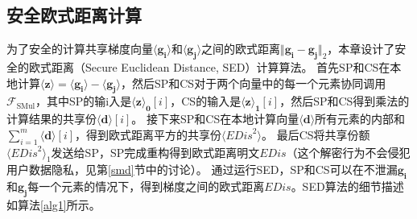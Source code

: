 \begin{table}
	\centering
	\caption{符号说明}
	\label{table-sym}
\end{table}

\subsection{安全欧式距离计算}
为了安全的计算共享梯度向量$\boldsymbol{\langle g_i\rangle}$和$\boldsymbol{\langle g_j\rangle}$之间的欧式距离$\Vert \boldsymbol{g_i} - \boldsymbol{g_j} \Vert_2$，本章设计了安全的欧式距离（Secure Euclidean Distance, SED）计算算法。
首先SP和CS在本地计算$\boldsymbol{\langle z\rangle} = \boldsymbol{\langle g_i\rangle} - \boldsymbol{\langle g_j\rangle}$，然后SP和CS对于两个向量中的每一个元素协同调用$\mathcal{F}_{\text {SMul}}$，其中SP的输i入是$\boldsymbol{\langle z\rangle_0}[i]$，CS的输入是$\boldsymbol{\langle z\rangle_1}[i]$，然后SP和CS得到乘法的计算结果的共享份$\boldsymbol{\langle d\rangle}[i]$。
接下来SP和CS在本地计算向量$\boldsymbol{\langle d\rangle}$所有元素的内部和$\sum_{i=1}^{m} \boldsymbol{\langle d\rangle}[i]$，得到欧式距离平方的共享份$\langle \textit{EDis}^2\rangle$。
最后CS将共享份额$\langle \textit{EDis}^2\rangle_1$发送给SP，SP完成重构得到欧式距离明文$\textit{EDis}$（这个解密行为不会侵犯用户数据隐私，见第\ref{smd}节中的讨论）。
通过运行SED，SP和CS可以在不泄漏$\boldsymbol{g_i}$和$\boldsymbol{g_j}$每一个元素的情况下，得到梯度之间的欧式距离$\textit{EDis}$。SED算法的细节描述如算法\ref{alg1}所示。

